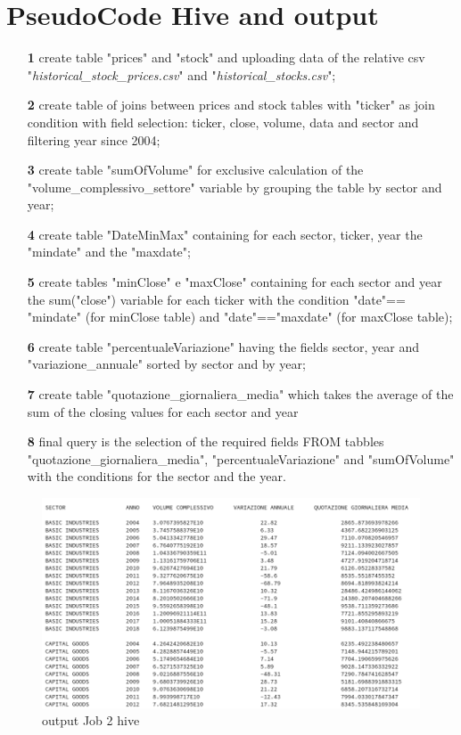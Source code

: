 \documentclass[]{report}
\begin{document}
\section*{PseudoCode Hive and output}
	\begin{itemize}
	\item[\textbf{1}] create table "prices" and "stock" and uploading data of the relative csv "\textit{historical\_stock\_prices.csv}" and "\textit{historical\_stocks.csv}";
	\item[\textbf{2}]  create table of joins between prices and stock tables with "ticker" as join condition with field selection: ticker, close, volume, data and sector and filtering year since 2004;
	\item[\textbf{3}] create table "sumOfVolume" for exclusive calculation of the "volume\_complessivo\_settore" variable by grouping the table by sector and year;
	\item[\textbf{4}] create table "DateMinMax" containing for each sector, ticker, year the "mindate" and the "maxdate";
	\item[\textbf{5}] create tables "minClose" e "maxClose" containing for each sector and year the sum("close") variable for each ticker with the condition "date"== "mindate" (for minClose table) and "date"=="maxdate" (for maxClose table);
	\item[\textbf{6}] create table "percentualeVariazione" having the fields sector, year and "variazione\_annuale" sorted by sector and by year;
	\item[\textbf{7}] create table "quotazione\_giornaliera\_media" which takes the average of the sum of the closing values for each sector and year
	\item[\textbf{8}] final query is the selection of the required fields FROM tabbles "quotazione\_giornaliera\_media", "percentualeVariazione" and "sumOfVolume" with the conditions for the sector and the year.
\end{itemize}
\begin{center}
	\begin{figure}[!htb]
		\hspace{-1 cm}
		\includegraphics[width=1.3 \linewidth]{figure/output2hive}
		\caption{output Job 2 hive}
	\end{figure}
\end{center}
\end{document}
